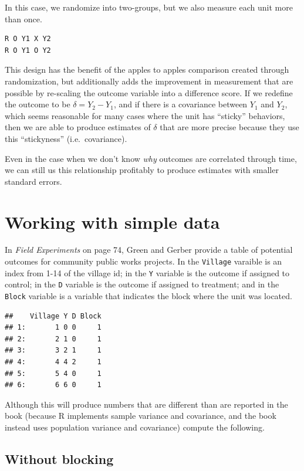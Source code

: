 \documentclass[
]{book}
\begin{document}
In this case, we randomize into two-groups, but we also measure each
unit more than once.

\begin{verbatim}
R O Y1 X Y2
R O Y1 O Y2 
\end{verbatim}

This design has the benefit of the apples to apples comparison created
through randomization, but additionally adds the improvement in
measurement that are possible by re-scaling the outcome variable into a
difference score. If we redefine the outcome to be
\(\delta = Y_{2} - Y_{1}\), and if there is a covariance between
\(Y_{1}\) and \(Y_{2}\), which seems reasonable for many cases where the
unit has ``sticky'' behaviors, then we are able to produce estimates of
\(\delta\) that are more precise because they use this ``stickyness''
(i.e.~covariance).

Even in the case when we don't know \emph{why} outcomes are correlated
through time, we can still us this relationship profitably to produce
estimates with smaller standard errors.

\hypertarget{working-with-simple-data}{%
\section{Working with simple data}\label{working-with-simple-data}}

In \emph{Field Experiments} on page 74, Green and Gerber provide a table
of potential outcomes for community public works projects. In the
\texttt{Village} varaible is an index from 1-14 of the village id; in
the \texttt{Y} variable is the outcome if assigned to control; in the
\texttt{D} variable is the outcome if assigned to treatment; and in the
\texttt{Block} variable is a variable that indicates the block where the
unit was located.

\begin{verbatim}
##    Village Y D Block
## 1:       1 0 0     1
## 2:       2 1 0     1
## 3:       3 2 1     1
## 4:       4 4 2     1
## 5:       5 4 0     1
## 6:       6 6 0     1
\end{verbatim}

Although this will produce numbers that are different than are reported
in the book (because R implements sample variance and covariance, and
the book instead uses population variance and covariance) compute the
following.

\hypertarget{without-blocking}{%
\subsection{Without blocking}\label{without-blocking}}
\end{document}
